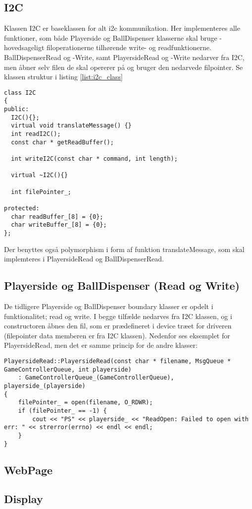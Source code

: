 \documentclass[Softwaredesign/Softwaredesign_main.tex]{subfiles}
\begin{document}
\subsection{I2C}
Klassen I2C er baseklassen for alt i2c kommunikation. Her implementeres alle funktioner, som både Playerside og BallDispenser klasserne skal bruge - hovedsageligt filoperationerne tilhørende write- og readfunktionerne. BallDispenserRead og -Write, samt PlayersideRead og -Write nedarver fra I2C, men åbner selv filen de skal opererer på og bruger den nedarvede filpointer. Se klassen struktur i listing \ref{list:i2c_class}
\begin{lstlisting}[caption={I2C headerfil}, label=list:i2c_class]
class I2C
{
public:
  I2C(){};
  virtual void translateMessage() {}
  int readI2C();
  const char * getReadBuffer();

  int writeI2C(const char * command, int length);

  virtual ~I2C(){}

  int filePointer_;

protected:
  char readBuffer_[8] = {0};
  char writeBuffer_[8] = {0};
};
\end{lstlisting}
Der benyttes også polymorphism i form af funktion translateMessage, som skal implemteres i PlayersideRead og BallDispenserRead. 

\subsection{Playerside og BallDispenser (Read og Write)}
De tidligere Playerside og BallDispenser boundary klasser er opdelt i funktionalitet; read og write. I begge tilfælde nedarves fra I2C klassen, og i constructoren åbnes den fil, som er prædefineret i device træet for driveren (filepointer data memberen er fra I2C klassen). Nedenfor ses eksemplet for PlayersideRead, men det er samme princip for de andre klasser: 
\begin{lstlisting}[caption={PlayersideRead constructor}, label=list:construct]
PlayersideRead::PlayersideRead(const char * filename, MsgQueue * GameControllerQueue, int playerside)
	: GameControllerQueue_(GameControllerQueue), playerside_(playerside)
{
	filePointer_ = open(filename, O_RDWR);
	if (filePointer_ == -1) {
		cout << "PS" << playerside_ << "ReadOpen: Failed to open with err: " << strerror(errno) << endl << endl;
	}
}
\end{lstlisting}

\subsection{WebPage}

\subsection{Display}
\end{document}
